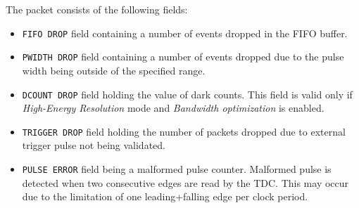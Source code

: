%
\noindent The packet consists of the following fields:
\begin{itemize}
\item \verb|FIFO DROP| field containing a number of events dropped in the FIFO buffer.
\item \verb|PWIDTH DROP| field containing a number of events dropped due to the pulse width being outside of the specified range.
\item \verb|DCOUNT DROP| field holding the value of dark counts. This field is valid only if \emph{High-Energy Resolution} mode and \emph{Bandwidth optimization} is enabled. 
\item \verb|TRIGGER DROP| field holding the number of packets dropped due to external trigger pulse not being validated. 
\item \verb|PULSE ERROR| field being a malformed pulse counter. Malformed pulse is detected when two consecutive edges are read by the TDC. This may occur due to the limitation of one leading+falling edge per clock period.
\end{itemize}
\newpage
%
